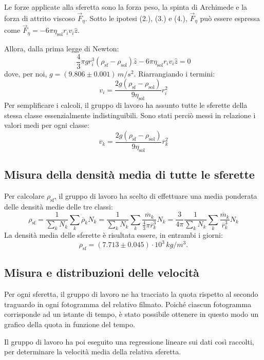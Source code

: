 \documentclass{article}
\begin{document}
\vspace{2mm}

Le forze applicate alla sferetta sono la forza peso, la spinta di Archimede
e la forza di attrito viscoso $\vec{F}_\eta$.
Sotto le ipotesi (2.), (3.) e (4.), $\vec{F}_\eta$ può essere espressa come
$\vec{F}_\eta = -6\pi\eta_\text{sol} r_i v_i\hat{z}$.

Allora, dalla prima legge di Newton:
\[
  \frac{4}{3}\pi g r_i^3 (\rho_\text{sf} - \rho_\text{sol}) \hat{z}
  -6\pi\eta_\text{sol} r_i v_i\hat{z} = 0
\]
dove, per noi, $g = (9.806\pm0.001)\,\unit{m\per s^2}$.
Riarrangiando i termini:
\[
  v_i = \frac{2g(\rho_\text{sf} - \rho_\text{sol})}{9\eta_\text{sol}} r_i^2
\]
Per semplificare i calcoli, il gruppo di lavoro ha assunto tutte le sferette
della stessa classe essenzialmente indistinguibili. Sono stati perciò messi
in relazione i valori medi per ogni classe: \[
  \overline{v}_k = \frac{2g(\rho_\text{sf} - \rho_\text{sol})}{9\eta_\text{sol}}
  \overline{r}_k^2
\]

\subsection{Misura della densità media di tutte le sferette}
Per calcolare $\rho_\text{sf}$, il gruppo di lavoro ha scelto di
effettuare una media ponderata delle densità medie delle tre classi:
\[
  \rho_\text{sf} = \frac{1}{\sum_k N_k} \sum_k \overline{\rho}_k N_k
    = \frac{1}{\sum_k N_k} \sum_k \frac{\overline{m}_k}{
      \frac{4}{3}\pi \overline{r}_k^3} N_k
    = \frac{3}{4\pi} \frac{1}{\sum_k N_k} \sum_k \frac{\overline{m}_k}{
      \overline{r}_k^3} N_k
\]
La densità media delle sferette è risultata essere,
in entrambi i giorni:
\[\rho_\text{sf} = (7.713\pm0.045)\cdot10^3\,\unit{kg \per m^3}.\]

\subsection{Misura e distribuzioni delle velocità}
Per ogni sferetta, il gruppo di lavoro ne ha tracciato la quota
rispetto al secondo traguardo in ogni fotogramma del relativo filmato.
Poiché ciascun fotogramma corrisponde ad un istante di tempo,
è stato possibile ottenere in questo modo un grafico della quota
in funzione del tempo.

Il gruppo di lavoro ha poi eseguito una regressione lineare sui dati così
raccolti, per determinare la velocità media della relativa sferetta.
\end{document}
